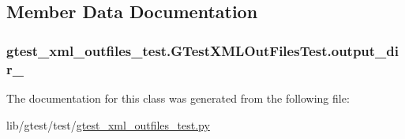 \subsection{Member Data Documentation}
\hypertarget{classgtest__xml__outfiles__test_1_1_g_test_x_m_l_out_files_test_aa5c31cd97047bc1d3060f4d27bc956a4}{
\subsubsection[{output\-\_\-dir\-\_\-}]{\setlength{\rightskip}{0pt plus 5cm}gtest\-\_\-xml\-\_\-outfiles\-\_\-test.\-G\-Test\-X\-M\-L\-Out\-Files\-Test.\-output\-\_\-dir\-\_\-}}\label{classgtest__xml__outfiles__test_1_1_g_test_x_m_l_out_files_test_aa5c31cd97047bc1d3060f4d27bc956a4}


The documentation for this class was generated from the following file\-:\begin{DoxyCompactItemize}
\item 
lib/gtest/test/\hyperlink{gtest__xml__outfiles__test_8py}{gtest\-\_\-xml\-\_\-outfiles\-\_\-test.\-py}\end{DoxyCompactItemize}
